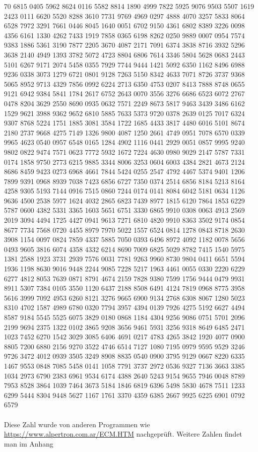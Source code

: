 70 6815 0405
5962 8624 0116 5582 8814
1890 4999 7822 5925 9076
9503 5507 1619 2423 0111
6620 5520 8288 3610 7731
9769 4969 0297 4888 4070
3257 5833 8064 6528 7972
3291 7661 0446 8045 1640
0051 6702 9150 4361 6802
8389 3226 0098 4356 6161
1330 4262 7433 1919 7858
0365 6198 8262 0250 9889
0007 0954 7574 9383 1886
5361 3190 7877 2205 3670
4087 2171 7091 6374 3838
8716 3932 5296 3638 2140
4949 1393 3782 5072 4723
8804 6806 7614 3346 5804
5628 0683 2443 5101 6267
9171 2074 5458 0355 7929
7744 9444 1421 5092 6350
1162 8496 6988 9236 0338
3073 1279 6721 0801 9128
7263 5150 8342 4633 7071
8726 3737 9368 5065 8952
9713 4329 7856 0992 6224
2713 6350 4753 0207 8413
7888 8748 0655 9121 6942
9384 5841 1784 2617 6752
2643 0070 3556 3276 6686
6523 6072 2767 0478 8204
3629 2550 8690 0935 0632
7571 2249 8673 5817 9463
3439 3486 6162 1529 9621
3988 9362 9652 6810 5885
7633 5373 9720 0378 2639
0125 7017 6324 9307 8768
5224 1751 1885 3081 3584
1722 1685 4433 3817 4480
6016 5101 8674 2180 2737
9668 4275 7149 1326 9800
4087 1250 2661 4749 0951
7078 6570 0339 9965 4623
0540 0957 6548 0165 1284
4902 1116 0441 2929 0051
0857 9995 9240 9802 0822
9474 7571 0623 7772 5932
1672 7224 4630 0980 9029
2147 5787 7331 0174 1858
9750 2773 6215 9885 3344
8006 3253 0604 6003 4384
2821 4673 2124 8686 8459
9423 0273 6968 4661 7844
5424 0255 2547 4792 4467
5374 9401 1206 7899 9391
0968 8939 7038 7423 6856
6727 7350 0374 2514 6856
8184 5213 8164 4258 9305
5193 7144 0916 7515 0860
7244 0174 0141 8084 6042
5181 0634 1126 9636 4500
2538 5977 1624 4032 2865
6823 7439 8977 1815 6120
7864 1853 6229 5787 0600
4382 5331 3365 1603 5651
6751 3330 6865 9910 0308
0063 4913 2569 2019 3094
4494 1725 4427 0941 9613
7271 6810 4820 9910 8363
3502 9174 0854 8677 7734
7568 0720 4455 8979 7970
5022 1557 6524 0814 1278
0843 8718 2630 3908 1154
0097 0824 7859 4337 5885
7050 0393 6496 8972 4092
1182 0078 5656 0493 9605
3816 6074 4358 4332 6214
8690 7009 6825 5029 8782
7415 1540 5975 1381 2588
1923 3731 2939 7576 0031
7781 9263 9960 8730 9804
0411 6651 5594 1936 1198
8630 9016 9448 2244 9085
7228 5217 1963 4461 0055
0330 2220 6229 6277 4812
8053 7639 0871 8791 4674
2159 7828 9380 7599 1756
9444 0479 9931 8911 5307
7384 0105 3550 1120 6437
2188 8508 6491 4124 7819
0968 8775 3958 5616 3999
7092 4953 6260 8121 3276
9665 6900 9134 2768 6308
8067 1280 5023 8310 4702
1587 4989 6780 0320 7794
3957 4394 0139 7926 4275
5192 6627 4494 8587 9184
5545 5525 6075 3829 0180
0868 1184 4304 9256 9086
0751 5701 2096 2199 9694
2375 1322 0102 3865 9208
3656 9461 5931 3256 9318
8649 6485 2471 1023 7452
6270 1542 3029 3085 6406
4691 0217 4783 4265 3842
1920 4077 0900 8805 7200
6880 2156 9270 3522 4746
6514 7127 1080 7195 0979
9595 9529 3246 9726 3472
4012 0939 3505 3249 8908
8835 0540 0900 3795 9129
0667 8220 6335 1467 9553
0848 7085 5458 0141 1058
7791 3737 2972 0536 9327
7136 3663 3385 1034 2973
6790 2383 6961 9534 6174
4388 2640 5243 9154 9655
7946 0048 8789 7953 8528
3864 1039 7464 3673 5184
1846 6819 6396 5498 5830
4678 7511 1233 6299 5444
8304 9448 5627 1167 1761
3370 4359 6385 2667 9925
6225 6901 0792 6579 
\\
\\
Diese Zahl wurde von anderen Programmen wie \url{https://www.alpertron.com.ar/ECM.HTM} nachgeprüft. Weitere Zahlen findet man im Anhang\\
\\

